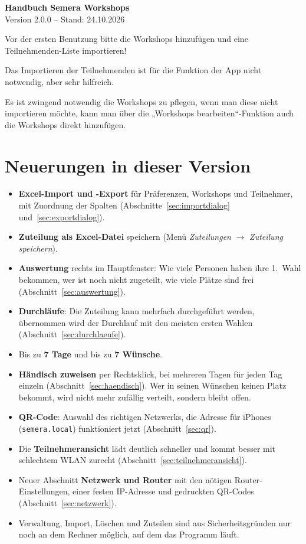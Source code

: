 \documentclass[a4paper,11pt]{article}
\newcommand{\manualversion}{2.0.0}
\newcommand{\manualdate}{24.10.2026}
\newcommand{\pfeil}{\ensuremath{\rightarrow}}
\begin{document}
\begin{center}
  {\LARGE\bfseries Handbuch Semera Workshops}\\[0.6em]
  Version \manualversion{} -- Stand: \manualdate
\end{center}

\tableofcontents
\newpage
Vor der ersten Benutzung bitte die Workshops hinzufügen und eine Teilnehmenden-Liste importieren!

Das Importieren der Teilnehmenden ist für die Funktion der App nicht notwendig, aber sehr hilfreich.

Es ist zwingend notwendig die Workshops zu pflegen, wenn man diese nicht importieren möchte, kann man über die „Workshops bearbeiten“-Funktion auch die Workshops direkt hinzufügen.

\section{Neuerungen in dieser Version}\label{sec:neuerungen}

\begin{itemize}
  \item \textbf{Excel-Import und -Export} für Präferenzen, Workshops und Teilnehmer, mit Zuordnung der Spalten
  (Abschnitte~\ref{sec:importdialog} und~\ref{sec:exportdialog}).
  \item \textbf{Zuteilung als Excel-Datei} speichern (Menü \emph{Zuteilungen} \pfeil{} \emph{Zuteilung speichern}).
  \item \textbf{Auswertung} rechts im Hauptfenster: Wie viele Personen haben ihre 1.~Wahl bekommen, wer ist noch nicht
  zugeteilt, wie viele Plätze sind frei (Abschnitt~\ref{sec:auswertung}).
  \item \textbf{Durchläufe}: Die Zuteilung kann mehrfach durchgeführt werden, übernommen wird der Durchlauf mit den
  meisten ersten Wahlen (Abschnitt~\ref{sec:durchlaeufe}).
  \item Bis zu \textbf{7 Tage} und bis zu \textbf{7 Wünsche}.
  \item \textbf{Händisch zuweisen} per Rechtsklick, bei mehreren Tagen für jeden Tag einzeln
  (Abschnitt~\ref{sec:haendisch}). Wer in seinen Wünschen keinen Platz bekommt, wird nicht mehr zufällig verteilt,
  sondern bleibt offen.
  \item \textbf{QR-Code}: Auswahl des richtigen Netzwerks, die Adresse für iPhones (\texttt{semera.local}) funktioniert
  jetzt (Abschnitt~\ref{sec:qr}).
  \item Die \textbf{Teilnehmeransicht} lädt deutlich schneller und kommt besser mit schlechtem WLAN zurecht
  (Abschnitt~\ref{sec:teilnehmeransicht}).
  \item Neuer Abschnitt \textbf{Netzwerk und Router} mit den nötigen Router-Einstellungen, einer festen IP-Adresse und
  gedruckten QR-Codes (Abschnitt~\ref{sec:netzwerk}).
  \item Verwaltung, Import, Löschen und Zuteilen sind aus Sicherheitsgründen nur noch an dem Rechner möglich, auf dem das
  Programm läuft.
\end{itemize}
\end{document}
